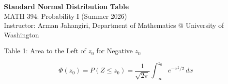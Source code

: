 \documentclass[11pt]{article}
\begin{document}
\begin{center}
{\Large\bfseries Standard Normal Distribution Table}\\[-1mm]
{\normalsize MATH 394: Probability I (Summer 2026)}\\[-1mm]
{\small Instructor: Arman Jahangiri, Department of Mathematics @ University of Washington}
\end{center}

\vspace{-2mm}

\begin{distbox}{Table 1: Area to the Left of $z_0$ for Negative $z_0$}

\[
\Phi(z_0)=P(Z\le z_0)
=
\frac{1}{\sqrt{2\pi}}
\int_{-\infty}^{z_0} e^{-x^2/2}\,dx
\]

\centering
\normalsize
\setlength{\tabcolsep}{7pt}
\renewcommand{\arraystretch}{0.75}


\end{distbox}
\end{document}
